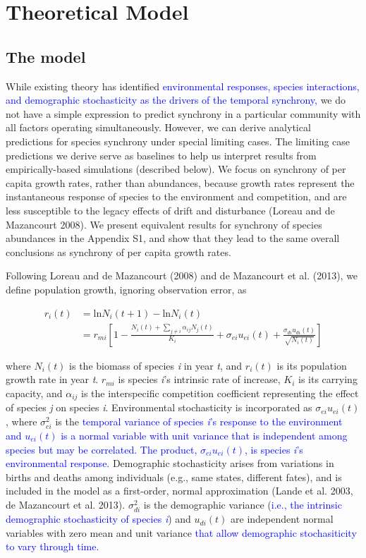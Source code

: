\documentclass[12pt,]{article}
\begin{document}
\section{Theoretical Model}\subsection{The model}

While existing theory has identified
\textcolor{blue}{environmental responses, species interactions, and demographic stochasticity as the drivers of the temporal synchrony,}
we do not have a simple expression to predict synchrony in a particular
community with all factors operating simultaneously. However, we can
derive analytical predictions for species synchrony under special
limiting cases. The limiting case predictions we derive serve as
baselines to help us interpret results from empirically-based
simulations (described below). We focus on synchrony of per capita
growth rates, rather than abundances, because growth rates represent the
instantaneous response of species to the environment and competition,
and are less susceptible to the legacy effects of drift and disturbance
(Loreau and {{de Mazancourt}} 2008). We present equivalent results for
synchrony of species abundances in the Appendix S1, and show that they
lead to the same overall conclusions as synchrony of per capita growth
rates.

Following Loreau and {{de Mazancourt}} (2008) and {{de Mazancourt}} et
al. (2013), we define population growth, ignoring observation error, as

\begin{align}
r_i(t) &= \text{ln}N_i(t+1) - \text{ln}N_i(t) \\
&= r_{mi} \left[ 1- \frac{N_i(t)+\sum_{j \neq i} \alpha_{ij}N_j(t)} {K_i} + \sigma_{ei}u_{ei}(t) + \frac{\sigma_{di}u_{di}(t)}{\sqrt{N_i(t)}} \right]
\end{align}

\noindent where \(N_i(t)\) is the biomass of species \emph{i} in year
\emph{t}, and \(r_i(t)\) is its population growth rate in year \emph{t}.
\(r_{mi}\) is species \emph{i}'s intrinsic rate of increase, \(K_i\) is
its carrying capacity, and \(\alpha_{ij}\) is the interspecific
competition coefficient representing the effect of species \emph{j} on
species \emph{i}. Environmental stochasticity is incorporated as
\(\sigma_{ei}u_{ei}(t)\), where \(\sigma_{ei}^2\) is the
\textcolor{blue}{temporal variance of species \emph{i}'s response to the environment and $u_{ei}(t)$ is a normal variable with unit variance that is independent among species but may be correlated.}
\textcolor{blue}{The product, $\sigma_{ei}u_{ei}(t)$, is species \emph{i}'s environmental response.}
Demographic stochasticity arises from variations in births and deaths
among individuals (e.g., same states, different fates), and is included
in the model as a first-order, normal approximation (Lande et al. 2003,
{{de Mazancourt}} et al. 2013). \(\sigma_{di}^2\) is the demographic
variance
(\textcolor{blue}{i.e., the intrinsic demographic stochasticity of species \emph{i}})
and \(u_{di}(t)\) are independent normal variables with zero mean and
unit variance
\textcolor{blue}{that allow demographic stochasiticity to vary through time.}
\end{document}
